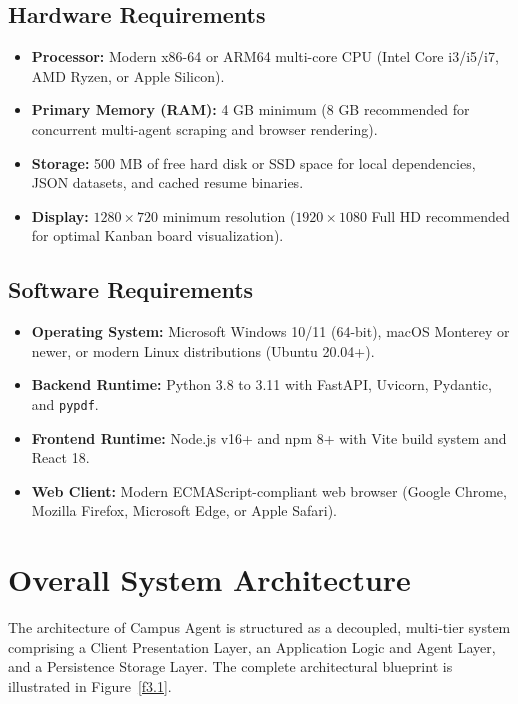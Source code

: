 \subsection{Hardware Requirements}
\begin{itemize}
	\item \textbf{Processor:} Modern x86-64 or ARM64 multi-core CPU (Intel Core i3/i5/i7, AMD Ryzen, or Apple Silicon).
	\item \textbf{Primary Memory (RAM):} 4 GB minimum (8 GB recommended for concurrent multi-agent scraping and browser rendering).
	\item \textbf{Storage:} 500 MB of free hard disk or SSD space for local dependencies, JSON datasets, and cached resume binaries.
	\item \textbf{Display:} $1280 \times 720$ minimum resolution ($1920 \times 1080$ Full HD recommended for optimal Kanban board visualization).
\end{itemize}

\subsection{Software Requirements}
\begin{itemize}
	\item \textbf{Operating System:} Microsoft Windows 10/11 (64-bit), macOS Monterey or newer, or modern Linux distributions (Ubuntu 20.04+).
	\item \textbf{Backend Runtime:} Python 3.8 to 3.11 with FastAPI, Uvicorn, Pydantic, and \texttt{pypdf}.
	\item \textbf{Frontend Runtime:} Node.js v16+ and npm 8+ with Vite build system and React 18.
	\item \textbf{Web Client:} Modern ECMAScript-compliant web browser (Google Chrome, Mozilla Firefox, Microsoft Edge, or Apple Safari).
\end{itemize}

\section{Overall System Architecture} \label{S3.4}
The architecture of Campus Agent is structured as a decoupled, multi-tier system comprising a Client Presentation Layer, an Application Logic and Agent Layer, and a Persistence Storage Layer. The complete architectural blueprint is illustrated in Figure~\ref{f3.1}.

